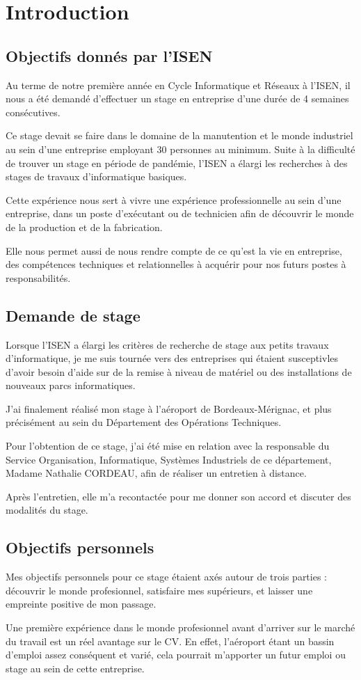 \chapter{Introduction}

\section{Objectifs donnés par l'ISEN}


Au terme de notre première année en Cycle Informatique et Réseaux à l’ISEN, il nous a été demandé d’effectuer un stage en entreprise d’une durée de 4 semaines consécutives.


Ce stage devait se faire dans le domaine de la manutention et le monde industriel au sein d’une entreprise employant 30 personnes au minimum. Suite à la difficulté de trouver un stage en période de pandémie, l’ISEN a élargi les recherches à des stages de travaux d’informatique basiques.


Cette expérience nous sert à vivre une expérience professionnelle au sein d’une entreprise, dans un poste d’exécutant ou de technicien afin de découvrir le monde de la production et de la fabrication.


Elle nous permet aussi de nous rendre compte de ce qu'est la vie en entreprise, des compétences techniques et relationnelles à acquérir pour nos futurs postes à responsabilités.


\section{Demande de stage}

Lorsque l’ISEN a élargi les critères de recherche de stage aux petits travaux d’informatique, je me suis tournée vers des entreprises qui étaient susceptivles d'avoir besoin d’aide sur de la remise à niveau de matériel ou des installations de nouveaux parcs informatiques.


J’ai finalement réalisé mon stage à l’aéroport de Bordeaux-Mérignac, et plus précisément au sein du Département des Opérations Techniques.


Pour l’obtention de ce stage, j’ai été mise en relation avec la responsable du Service Organisation, Informatique, Systèmes Industriels de ce département, Madame Nathalie CORDEAU, afin de réaliser un entretien à distance.

Après l’entretien, elle m'a recontactée pour me donner son accord et discuter des modalités du stage.


\section{Objectifs personnels}

Mes objectifs personnels pour ce stage étaient axés autour de trois parties : découvrir le monde profesionnel, satisfaire mes supérieurs, et laisser une empreinte positive de mon passage.


Une première expérience dans le monde profesionnel avant d’arriver sur le marché du travail est un réel avantage sur le CV. En effet, l’aéroport étant un bassin d’emploi assez conséquent et varié, cela pourrait m’apporter un futur emploi ou stage au sein de cette entreprise.